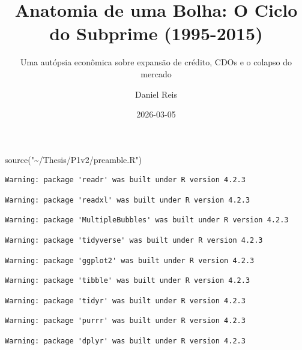 \documentclass[
  portuguese,
  letterpaper,
  DIV=11,
  numbers=noendperiod,
  oneside]{scrartcl}
\title{Anatomia de uma Bolha: O Ciclo do Subprime (1995-2015)}
\subtitle{Uma autópsia econômica sobre expansão de crédito, CDOs e o
colapso do mercado}
\author{Daniel Reis}
\date{2026-03-05}
\newenvironment{Shaded}{\begin{snugshade}}{\end{snugshade}}
\newcommand{\FunctionTok}[1]{\textcolor[rgb]{0.28,0.35,0.67}{#1}}
\newcommand{\NormalTok}[1]{\textcolor[rgb]{0.00,0.23,0.31}{#1}}
\newcommand{\StringTok}[1]{\textcolor[rgb]{0.13,0.47,0.30}{#1}}
\renewcommand*\contentsname{Índice}
\newcommand\contentsname{Índice}
\begin{document}
\maketitle

\renewcommand*\contentsname{Índice}
{
\hypersetup{linkcolor=}
\setcounter{tocdepth}{3}
\tableofcontents
}

\begin{Shaded}
\begin{Highlighting}[]
\FunctionTok{source}\NormalTok{(}\StringTok{"\textasciitilde{}/Thesis/P1v2/preamble.R"}\NormalTok{)}
\end{Highlighting}
\end{Shaded}

\begin{verbatim}
Warning: package 'readr' was built under R version 4.2.3
\end{verbatim}

\begin{verbatim}
Warning: package 'readxl' was built under R version 4.2.3
\end{verbatim}

\begin{verbatim}
Warning: package 'MultipleBubbles' was built under R version 4.2.3
\end{verbatim}

\begin{verbatim}
Warning: package 'tidyverse' was built under R version 4.2.3
\end{verbatim}

\begin{verbatim}
Warning: package 'ggplot2' was built under R version 4.2.3
\end{verbatim}

\begin{verbatim}
Warning: package 'tibble' was built under R version 4.2.3
\end{verbatim}

\begin{verbatim}
Warning: package 'tidyr' was built under R version 4.2.3
\end{verbatim}

\begin{verbatim}
Warning: package 'purrr' was built under R version 4.2.3
\end{verbatim}

\begin{verbatim}
Warning: package 'dplyr' was built under R version 4.2.3
\end{verbatim}
\end{document}
